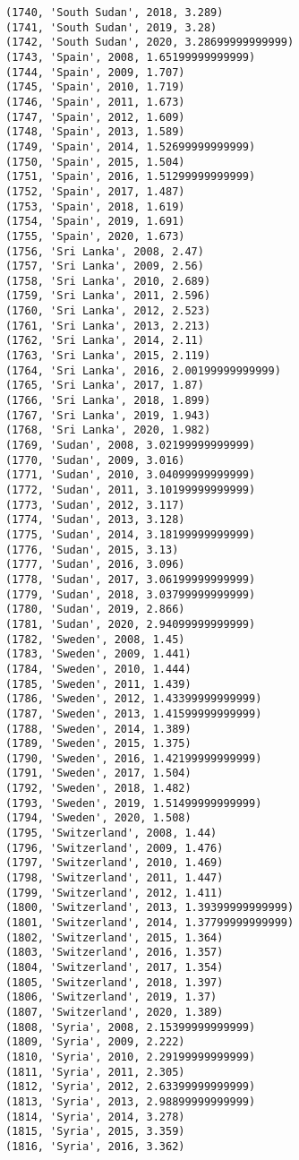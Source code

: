 \documentclass[11pt]{article}
\begin{document}
\begin{Verbatim}[commandchars=\\\{\}]
(1740, 'South Sudan', 2018, 3.289)
(1741, 'South Sudan', 2019, 3.28)
(1742, 'South Sudan', 2020, 3.28699999999999)
(1743, 'Spain', 2008, 1.65199999999999)
(1744, 'Spain', 2009, 1.707)
(1745, 'Spain', 2010, 1.719)
(1746, 'Spain', 2011, 1.673)
(1747, 'Spain', 2012, 1.609)
(1748, 'Spain', 2013, 1.589)
(1749, 'Spain', 2014, 1.52699999999999)
(1750, 'Spain', 2015, 1.504)
(1751, 'Spain', 2016, 1.51299999999999)
(1752, 'Spain', 2017, 1.487)
(1753, 'Spain', 2018, 1.619)
(1754, 'Spain', 2019, 1.691)
(1755, 'Spain', 2020, 1.673)
(1756, 'Sri Lanka', 2008, 2.47)
(1757, 'Sri Lanka', 2009, 2.56)
(1758, 'Sri Lanka', 2010, 2.689)
(1759, 'Sri Lanka', 2011, 2.596)
(1760, 'Sri Lanka', 2012, 2.523)
(1761, 'Sri Lanka', 2013, 2.213)
(1762, 'Sri Lanka', 2014, 2.11)
(1763, 'Sri Lanka', 2015, 2.119)
(1764, 'Sri Lanka', 2016, 2.00199999999999)
(1765, 'Sri Lanka', 2017, 1.87)
(1766, 'Sri Lanka', 2018, 1.899)
(1767, 'Sri Lanka', 2019, 1.943)
(1768, 'Sri Lanka', 2020, 1.982)
(1769, 'Sudan', 2008, 3.02199999999999)
(1770, 'Sudan', 2009, 3.016)
(1771, 'Sudan', 2010, 3.04099999999999)
(1772, 'Sudan', 2011, 3.10199999999999)
(1773, 'Sudan', 2012, 3.117)
(1774, 'Sudan', 2013, 3.128)
(1775, 'Sudan', 2014, 3.18199999999999)
(1776, 'Sudan', 2015, 3.13)
(1777, 'Sudan', 2016, 3.096)
(1778, 'Sudan', 2017, 3.06199999999999)
(1779, 'Sudan', 2018, 3.03799999999999)
(1780, 'Sudan', 2019, 2.866)
(1781, 'Sudan', 2020, 2.94099999999999)
(1782, 'Sweden', 2008, 1.45)
(1783, 'Sweden', 2009, 1.441)
(1784, 'Sweden', 2010, 1.444)
(1785, 'Sweden', 2011, 1.439)
(1786, 'Sweden', 2012, 1.43399999999999)
(1787, 'Sweden', 2013, 1.41599999999999)
(1788, 'Sweden', 2014, 1.389)
(1789, 'Sweden', 2015, 1.375)
(1790, 'Sweden', 2016, 1.42199999999999)
(1791, 'Sweden', 2017, 1.504)
(1792, 'Sweden', 2018, 1.482)
(1793, 'Sweden', 2019, 1.51499999999999)
(1794, 'Sweden', 2020, 1.508)
(1795, 'Switzerland', 2008, 1.44)
(1796, 'Switzerland', 2009, 1.476)
(1797, 'Switzerland', 2010, 1.469)
(1798, 'Switzerland', 2011, 1.447)
(1799, 'Switzerland', 2012, 1.411)
(1800, 'Switzerland', 2013, 1.39399999999999)
(1801, 'Switzerland', 2014, 1.37799999999999)
(1802, 'Switzerland', 2015, 1.364)
(1803, 'Switzerland', 2016, 1.357)
(1804, 'Switzerland', 2017, 1.354)
(1805, 'Switzerland', 2018, 1.397)
(1806, 'Switzerland', 2019, 1.37)
(1807, 'Switzerland', 2020, 1.389)
(1808, 'Syria', 2008, 2.15399999999999)
(1809, 'Syria', 2009, 2.222)
(1810, 'Syria', 2010, 2.29199999999999)
(1811, 'Syria', 2011, 2.305)
(1812, 'Syria', 2012, 2.63399999999999)
(1813, 'Syria', 2013, 2.98899999999999)
(1814, 'Syria', 2014, 3.278)
(1815, 'Syria', 2015, 3.359)
(1816, 'Syria', 2016, 3.362)

\end{Verbatim}
\end{document}
